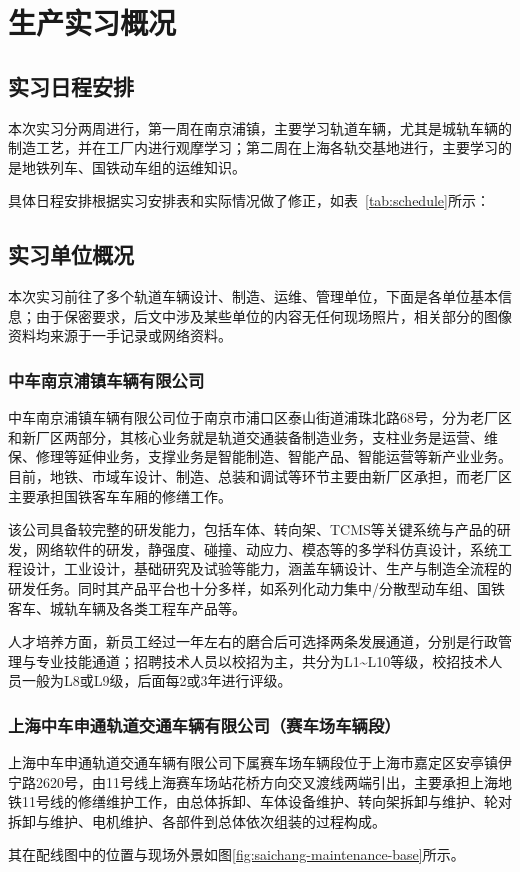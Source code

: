 ﻿\section{生产实习概况}

\subsection{实习日程安排}
本次实习分两周进行，第一周在南京浦镇，主要学习轨道车辆，尤其是城轨车辆的制造工艺，并在工厂内进行观摩学习；第二周在上海各轨交基地进行，主要学习的是地铁列车、国铁动车组的运维知识。\par{}
具体日程安排根据实习安排表和实际情况做了修正，如表~\ref{tab:schedule}所示：\par{}


\subsection{实习单位概况}
本次实习前往了多个轨道车辆设计、制造、运维、管理单位，下面是各单位基本信息；由于保密要求，后文中涉及某些单位的内容无任何现场照片，相关部分的图像资料均来源于一手记录或网络资料。

\subsubsection{中车南京浦镇车辆有限公司}
中车南京浦镇车辆有限公司位于南京市浦口区泰山街道浦珠北路68号，分为老厂区和新厂区两部分，其核心业务就是轨道交通装备制造业务，支柱业务是运营、维保、修理等延伸业务，支撑业务是智能制造、智能产品、智能运营等新产业业务。目前，地铁、市域车设计、制造、总装和调试等环节主要由新厂区承担，而老厂区主要承担国铁客车车厢的修缮工作。\par{}
该公司具备较完整的研发能力，包括车体、转向架、TCMS等关键系统与产品的研发，网络软件的研发，静强度、碰撞、动应力、模态等的多学科仿真设计，系统工程设计，工业设计，基础研究及试验等能力，涵盖车辆设计、生产与制造全流程的研发任务。同时其产品平台也十分多样，如系列化动力集中/分散型动车组、国铁客车、城轨车辆及各类工程车产品等。\par{}
人才培养方面，新员工经过一年左右的磨合后可选择两条发展通道，分别是行政管理与专业技能通道；招聘技术人员以校招为主，共分为L1\textasciitilde{}L10等级，校招技术人员一般为L8或L9级，后面每2或3年进行评级。\par{}

\subsubsection{上海中车申通轨道交通车辆有限公司（赛车场车辆段）}
上海中车申通轨道交通车辆有限公司下属赛车场车辆段位于上海市嘉定区安亭镇伊宁路2620号，由11号线上海赛车场站花桥方向交叉渡线两端引出，主要承担上海地铁11号线的修缮维护工作，由总体拆卸、车体设备维护、转向架拆卸与维护、轮对拆卸与维护、电机维护、各部件到总体依次组装的过程构成。\par{}
其在配线图中的位置与现场外景如图\ref{fig:saichang-maintenance-base}所示。\par{}

